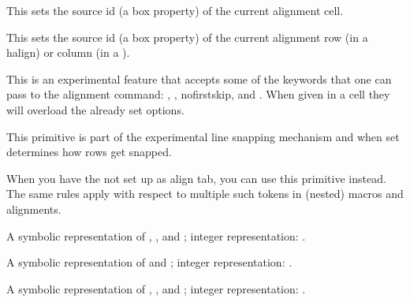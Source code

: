This sets the source id (a box property) of the current alignment cell.

\stopnewprimitive

\startnewprimitive[title={\prm {alignmentwrapsource}}]

This sets the source id (a box property) of the current alignment row (in a \prm
{halign}) or column (in a ).

\stopnewprimitive

\startnewprimitive[title={\prm {alignoption}}]

This is an experimental feature that accepts some of the keywords that one can
pass to the alignment command: , , \typ
{nofirstskip},  and . When given in a cell they
will overload the already set options.

\stopnewprimitive

\startnewprimitive[title={\prm {alignsnapping}}]

This primitive is part of the experimental line snapping mechanism and when set
determines how rows get snapped.

\stopnewprimitive

\startnewprimitive[title={\prm {aligntab}}]

When you have the \type {&} not set up as align tab, you can use this primitive
instead. The same rules apply with respect to multiple such tokens in (nested)
macros and alignments.

\stopnewprimitive

\startnewprimitive[title={\prm {allcrampedstyles}}]

A symbolic representation of , ,
 and ; integer
representation: \the\allcrampedstyles.

\stopnewprimitive

\startnewprimitive[title={\prm {alldisplaystyles}}]

A symbolic representation of  and ;
integer representation: \the\alldisplaystyles.

\stopnewprimitive

\startnewprimitive[title={\prm {allmainstyles}}]

A symbolic representation of , ,
 and ; integer representation:
\the\allmainstyles.

